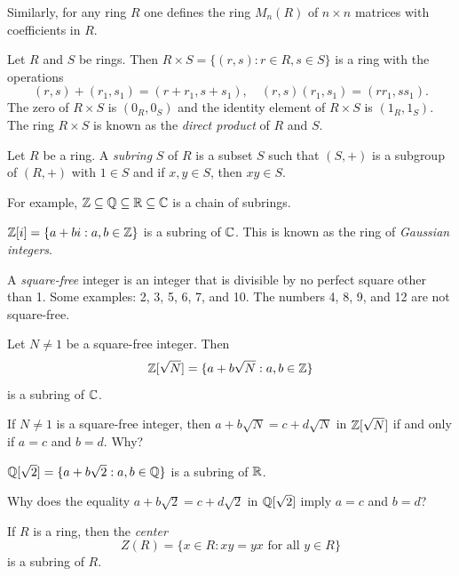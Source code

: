 Similarly, for any ring $R$ one defines the ring $M_n(R)$ of $n\times n$ matrices
with coefficients in $R$. 

\begin{example}
\label{exa:direct_rings}
    Let $R$ and $S$ be rings. Then 
    $R\times S=\{(r,s):r\in R,s\in S\}$ 
    is a ring with the operations 
    \[
    (r,s)+(r_1,s_1)=(r+r_1,s+s_1),\quad 
    (r,s)(r_1,s_1)=(rr_1,ss_1).
    \]
    The zero of $R\times S$ is $(0_R,0_S)$ and 
    the identity element of $R\times S$ is $(1_R,1_S)$. The ring 
    $R\times S$ is known as the \emph{direct product} of $R$ and $S$. 
\end{example}

\begin{definition}
    Let $R$ be a ring. A \emph{subring} $S$ of $R$ is a subset $S$ such that
    $(S,+)$ is a subgroup of $(R,+)$ with $1\in S$ and 
    if $x,y\in S$, then $xy\in S$. 
\end{definition}

For example, $\mathbb{Z}\subseteq\mathbb{Q}\subseteq\mathbb{R}\subseteq\mathbb{C}$ is a chain of subrings. 

\begin{example}
    $\mathbb{Z}[i]=\{a+bi:a,b\in\mathbb{Z}\}$ is a subring of $\mathbb{C}$. 
    This is known as the ring of \emph{Gaussian integers}.  
\end{example}

A \emph{square-free} integer is an integer that is divisible by 
no perfect square other than 1. Some examples: 2, 3, 5, 6, 7, and 10. 
The numbers 4, 8, 9, and 12 are not square-free. 

\begin{example}
  Let $N\ne1$ be a square-free integer. Then 
  \[
    \mathbb{Z}[\sqrt{N}]=\{a+b\sqrt{N}:a,b\in\mathbb{Z}\}
  \]
  is
	a subring of $\mathbb{C}$.  	
\end{example}

If $N\ne1$ is a square-free integer, then 
$a+b\sqrt{N}=c+d\sqrt{N}$ in $\mathbb{Z}[\sqrt{N}]$ 
if and only if $a=c$ and $b=d$. Why?

\begin{example}
    $\mathbb{Q}[\sqrt{2}]=\{a+b\sqrt{2}:a,b\in\mathbb{Q}\}$ is a subring of $\mathbb{R}$. 
\end{example}

Why does the 
equality $a+b\sqrt{2}=c+d\sqrt{2}$ in 
$\mathbb{Q}[\sqrt{2}]$
imply $a=c$ and $b=d$? 

\begin{example}
    If $R$ is a ring, then the \emph{center} 
    \[
    Z(R)=\{x\in R:xy=yx\text{ for all $y\in R$}\}
    \]
    is a subring of $R$. 
\end{example}

